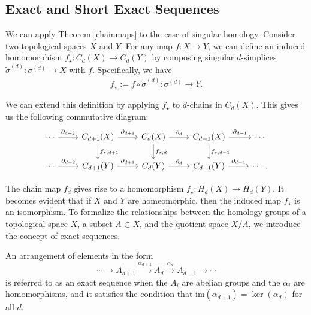 \subsection{Exact and Short Exact Sequences}
\label{ExactandShortExactSequences}
We can apply Theorem \ref{chainmaps} to the case of singular homology. Consider two topological spaces \( X \) and \( Y \). For any map \( f: X \rightarrow Y \), we can define an induced homomorphism \( f_{\star}: C_{d}(X) \rightarrow C_{d}(Y) \) by composing singular \( d \)-simplices \( \tilde{\sigma}^{(d)}: \sigma^{(d)} \rightarrow X \) with \( f \). Specifically, we have
\begin{align}
	f_{\star} := f \circ \tilde{\sigma}^{(d)}: \sigma^{(d)} \rightarrow Y. 
\end{align}

We can extend this definition by applying \( f_{\star} \) to \( d \)-chains in \( C_{d}(X) \). This gives us the following commutative diagram:
\begin{equation}
	\begin{tikzcd}
		\cdots \arrow[r, "\partial_{d+2}"] & C_{d+1}(X) \arrow[r, "\partial_{d+1}"] \arrow[d, "f_{\star, d+1}"] & C_d(X) \arrow[r, "\partial_d"] \arrow[d, "f_{\star, d}"] & C_{d-1}(X) \arrow[r, "\partial_{d-1}"] \arrow[d, "f_{\star, d-1}"] & \cdots \\ 
		\cdots \arrow[r, "\partial_{d+2}"] & C_{d+1}(Y) \arrow[r, "\partial_{d+1}"] & C_d(Y) \arrow[r, "\partial_d"] & C_{d-1}(Y) \arrow[r, "\partial_{d-1}"] & \cdots.
	\end{tikzcd}
\end{equation}

The chain map \( f_{d} \) gives rise to a homomorphism \( f_{\star}: H_{d}(X) \rightarrow H_{d}(Y) \). It becomes evident that if \( X \) and \( Y \) are homeomorphic, then the induced map \( f_{\star} \) is an isomorphism. To formalize the relationships between the homology groups of a topological space \( X \), a subset \( A \subset X \), and the quotient space \( X/A \), we introduce the concept of exact sequences.

\begin{definition}
	An arrangement of elements in the form
	\begin{equation}
		\cdots \rightarrow A_{d+1}\xrightarrow{\alpha_{d+1}}A_{d}\xrightarrow{\alpha_d} A_{d-1}\xrightarrow{}\cdots
	\end{equation}
	is referred to as an exact sequence when the \( A_{i} \) are abelian groups and the \( \alpha_{i} \) are homomorphisms, and it satisfies the condition that \( \mathrm{im}(\alpha_{d+1}) = \ker(\alpha_{d})\) for all \( d \).
\end{definition}

